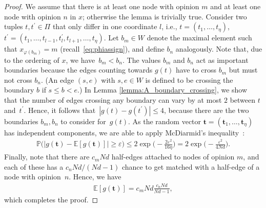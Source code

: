 \documentclass[a4paper,
               10pt,
               pdftex,
               normalheadings,
               headsepline,
               footsepline,
               headinclude,
               footinclude,
               DIV=14,
               abstracton]
{scrartcl}
\newcommand{\rv}[1]{\bm{#1}}
\newcommand{\ldif}{l}
\begin{document}
\begin{proof}
We assume that there is at least one node with opinion $m$ and at least one node with opinion $n$ in $x$; otherwise the lemma is trivially true.
Consider two tuples $t,t^\prime \in \Pi$ that only differ in one coordinate $\ldif$, i.e., $t = (t_1, \dots, t_\eta)$, $t^\prime = (t_1,\dots,t_{\ldif - 1}, t_\ldif^\prime, t_{\ldif + 1}, \dots, t_\eta)$.
Let $b_m \in W$ denote the maximal element such that $x_{\varphi(b_m)} = m$ (recall~\eqref{eq:phiassign}), and define $b_n$ analogously.
Note that, due to the ordering of $x$, we have~$b_m < b_n$.
The values $b_m$ and $b_n$ act as important boundaries because the edges counting towards $g(t)$ have to cross $b_m$ but must not cross $b_n$.
(An edge $(s,e)$ with $s,e \in W$ is defined to be crossing the boundary $b$ if $s \leq b < e$.)
In Lemma \ref{lemma:A_boundary_crossing}, we show that the number of edges crossing any boundary can vary by at most $2$ between $t$ and~$t^\prime$.
Hence, it follows that~$|g(t) - g(t^\prime)| \leq 4$, because there are the two boundaries $b_m,b_n$ to consider for~$g(t)$.
As the random vector $\rv{t} = (\rv{t}_1, \dots, \rv{t}_\eta)$ has independent components, we are able to apply McDiarmid's inequality~\cite{McDiarmid1989}:
\begin{align}
        \mathbb{P}\Big( \Big| g(\rv{t}) - \mathbb{E}[g(\rv{t})] \Big| \geq \varepsilon \Big) \leq 2 \exp\Big(-\frac{2 \varepsilon^2}{16 \eta}\Big) = 2 \exp\Big(-\frac{ \varepsilon^2}{4 Nd}\Big).
    \end{align}
Finally, note that there are $c_m N d$ half-edges attached to nodes of opinion $m$, and each of these has a $c_n N d / (Nd - 1)$ chance to get matched with a half-edge of a node with opinion~$n$.
Hence, we have
\begin{align}
    \mathbb{E}[g(\rv{t})] = c_m N d \frac{c_n N d}{Nd - 1},
\end{align}
which completes the proof.
\end{proof}
\end{document}
